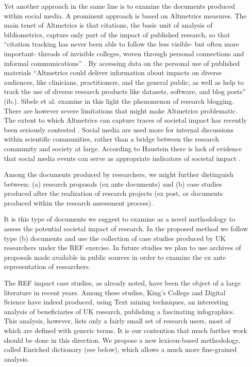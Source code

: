 \documentclass[b5paper,]{book}
\theoremstyle{definition}
\theoremstyle{definition}
\theoremstyle{definition}
\theoremstyle{remark}
\begin{document}
Yet another approach in the same line is to examine the documents
produced within social media. A prominent approach is based on
Altmetrics measures. The main tenet of Altmetrics is that citations, the
basic unit of analysis of bibliometrics, capture only part of the impact
of published research, so that ``citation tracking has never been able
to follow the less visible- but often more important- threads of
invisible colleges, woven through personal connections and informal
communications'' \citep{priem2012altmetrics}. By accessing data on the
personal use of published materials ``Altmetrics could deliver
information about impacts on diverse audiences, like clinicians,
practitioners, and the general public, as well as help to track the use
of diverse research products like datasets, software, and blog posts''
(ib.). Sibele et al. \citep{fausto2012research} examine in this light
the phenomenon of research blogging. There are however severe
limitations that might make Altmetrics problematic. The extent to which
Altmetrics can capture traces of societal impact has recently been
seriously contested \citep{bornmann2014evaluate}. Social media are used
more for internal discussions within scientific communities, rather than
a bridge between the research community and society at large. According
to Haustein there is lack of evidence that social media events can serve
as appropriate indicators of societal impact \citep{haustein2016tweets}.

Among the documents produced by researchers, we might further
distinguish between: (a) research proposals (ex ante documents) and (b)
case studies produced after the realization of research projects (ex
post, or documents produced within the research assessment process).

It is this type of documents we suggest to examine as a novel
methodology to assess the potential societal impact of research. In the
proposed method we follow type (b) documents and use the collection of
case studies produced by UK researchers under the REF exercise. In
future studies we plan to use archives of proposals made available in
public sources in order to examine the ex ante representation of
researchers.

The REF impact case studies, as already noted, have been the object of a
large literature in recent years. Among these studies, King's College
and Digital Science \citep{king2015nature} have indeed produced, using
Text mining techniques, an interesting analysis of beneficiaries of UK
research, publishing a fascinating infographics. This analysis, however,
lists only a fairly small set of research users, most of which are
defined with generic terms. It is our contention that much further work
should be done in this direction. We propose a new lexicon-based
methodology, called Enriched dictionary (see below), which allows a much
more fine-grained analysis.
\end{document}

